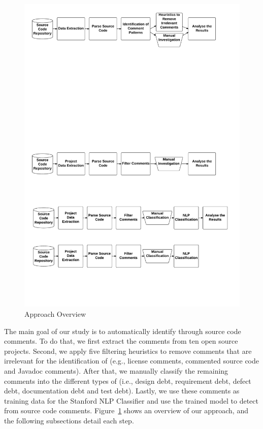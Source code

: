 \begin{figure}[thb!]
  \centering
  \includegraphics[width=1\textwidth]{figures/approach_reviwed.pdf}
  \caption{Approach Overview}
  \label{fig:approach}
  \vspace{-4mm}
\end{figure}

The main goal of our study is to automatically identify \SATD through source code comments. To do that, we first extract the comments from ten open source projects. Second, we apply five filtering heuristics to remove comments that are irrelevant for the identification of \SATD  (e.g., license comments, commented source code and Javadoc comments). After that, we manually classify the remaining comments into the different types of \SATD (i.e., design debt, requirement debt, defect debt, documentation debt and test debt). Lastly, we use these comments as training data for the Stanford NLP Classifier and use the trained model to detect \SATD from source code comments. Figure~\ref{fig:approach} shows an overview of our approach, and the following subsections detail each step.

